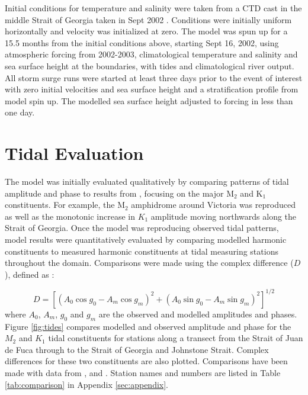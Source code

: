 \documentclass[pdftex,10pt]{article}
\begin{document}
Initial conditions for temperature and salinity were taken from a CTD cast in the middle Strait of Georgia taken in Sept 2002 \citep{pawlowiczetal2007}. Conditions were initially uniform horizontally and velocity was initialized at zero. The model was spun up for a 15.5 months from the initial conditions above, starting Sept 16, 2002, using atmospheric forcing from 2002-2003, climatological temperature and salinity and sea surface height at the boundaries, with tides and climatological river output.  All storm surge runs were started at least three days prior to the event of interest with zero initial velocities and sea surface height and a stratification profile from model spin up. The modelled sea surface height adjusted to forcing in less than one day. 

\section{Tidal Evaluation}\label{sec:model}

The model was initially evaluated qualitatively by comparing patterns of tidal amplitude and phase to results from \citet{foreman1995tidal}, focusing on the major M$_2$ and K$_1$ constituents. For example, the M$_2$ amphidrome around Victoria was reproduced as well as the monotonic increase in $K_1$ amplitude moving northwards along the Strait of Georgia. Once the model was reproducing observed tidal patterns, model results were quantitatively evaluated by comparing modelled harmonic constituents to measured harmonic constituents at tidal measuring stations throughout the domain. Comparisons were made using the complex difference ($D$), defined as \citep{foreman1995tidal}:

\begin{equation}
D = [(A_0 \cos g_0 - A_m \cos g_m)^2 + (A_0 \sin g_0 - A_m \sin g_m)^2]^{1/2}
\end{equation}\label{eq:compdiff}
where $A_0$, $A_m$, $g_0$ and $g_m$ are the observed and modelled amplitudes and phases. Figure \ref{fig:tides} compares modelled and observed amplitude and phase for the $M_2$ and $K_1$ tidal constituents for stations along a transect from the Strait of Juan de Fuca through to the Strait of Georgia and Johnstone Strait. Complex differences for these two constituents are also plotted.  Comparisons have been made with data from \citet{foreman1995tidal}, \citet{foreman2004m} and \citet{foreman2012circulation}. Station names and numbers are listed in Table  \ref{tab:comparison} in Appendix \ref{sec:appendix}.
\end{document}
